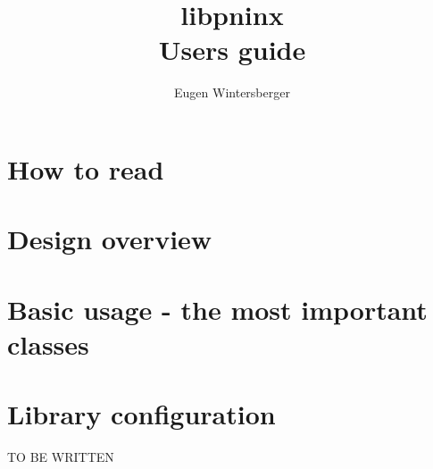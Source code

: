 \documentclass[a4paper,twoside]{book}
\author{Eugen Wintersberger}
\title{{\Huge libpninx\\ Users guide}}
\begin{document}
\maketitle
\tableofcontents

\chapter{How to read}\label{chapter:how_to_read}

\chapter{Design overview}\label{chapter:design_overview}


\chapter{Basic usage - the most important classes}\label{chapter:basic_usage}


\chapter{Library configuration}
TO BE WRITTEN
\end{document}
